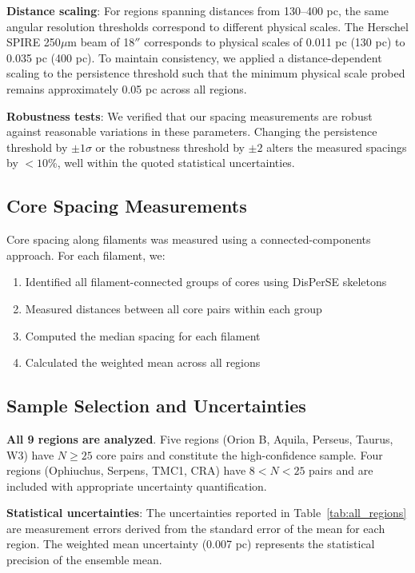 \documentclass[11pt,a4paper]{article}
\begin{document}
\textbf{Distance scaling}: For regions spanning distances from 130--400 pc, the same angular resolution thresholds correspond to different physical scales. The Herschel SPIRE 250$\mu$m beam of 18$''$ corresponds to physical scales of 0.011 pc (130 pc) to 0.035 pc (400 pc). To maintain consistency, we applied a distance-dependent scaling to the persistence threshold such that the minimum physical scale probed remains approximately 0.05 pc across all regions.

\textbf{Robustness tests}: We verified that our spacing measurements are robust against reasonable variations in these parameters. Changing the persistence threshold by $\pm 1\sigma$ or the robustness threshold by $\pm 2$ alters the measured spacings by $<10$\%, well within the quoted statistical uncertainties.

\subsection{Core Spacing Measurements}

Core spacing along filaments was measured using a connected-components approach. For each filament, we:
\begin{enumerate}
    \item Identified all filament-connected groups of cores using DisPerSE skeletons
    \item Measured distances between all core pairs within each group
    \item Computed the median spacing for each filament
    \item Calculated the weighted mean across all regions
\end{enumerate}

\subsection{Sample Selection and Uncertainties}

\textbf{All 9 regions are analyzed}. Five regions (Orion B, Aquila, Perseus, Taurus, W3) have $N \geq 25$ core pairs and constitute the high-confidence sample. Four regions (Ophiuchus, Serpens, TMC1, CRA) have $8 < N < 25$ pairs and are included with appropriate uncertainty quantification.

\textbf{Statistical uncertainties}: The uncertainties reported in Table~\ref{tab:all_regions} are measurement errors derived from the standard error of the mean for each region. The weighted mean uncertainty (0.007 pc) represents the statistical precision of the ensemble mean.
\end{document}
